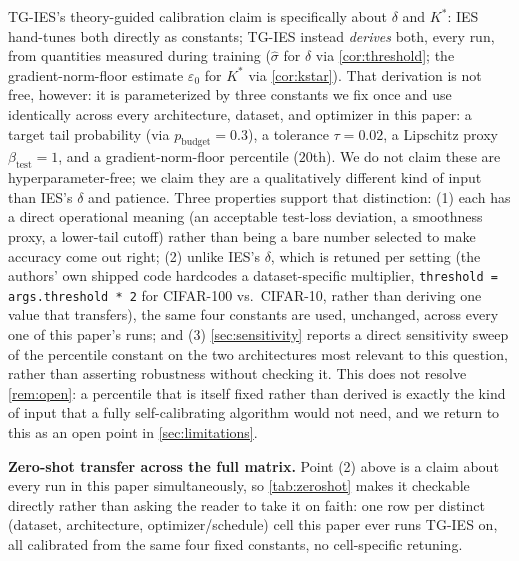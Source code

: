 \documentclass{article}
\theoremstyle{plain}
\theoremstyle{definition}
\theoremstyle{remark}
\begin{document}
TG-IES's theory-guided calibration claim is specifically about $\delta$ and $K^*$: IES hand-tunes both directly as constants; TG-IES instead \emph{derives} both, every run, from quantities measured during training ($\hat\sigma$ for $\delta$ via \cref{cor:threshold}; the gradient-norm-floor estimate $\varepsilon_0$ for $K^*$ via \cref{cor:kstar}). That derivation is not free, however: it is parameterized by three constants we fix once and use identically across every architecture, dataset, and optimizer in this paper: a target tail probability (via $p_{\mathrm{budget}}=0.3$), a tolerance $\tau=0.02$, a Lipschitz proxy $\beta_{\mathrm{test}}=1$, and a gradient-norm-floor percentile ($20$th). We do not claim these are hyperparameter-free; we claim they are a qualitatively different kind of input than IES's $\delta$ and patience. Three properties support that distinction: (1) each has a direct operational meaning (an acceptable test-loss deviation, a smoothness proxy, a lower-tail cutoff) rather than being a bare number selected to make accuracy come out right; (2) unlike IES's $\delta$, which is retuned per setting (the authors' own shipped code hardcodes a dataset-specific multiplier, \texttt{threshold = args.threshold * 2} for CIFAR-100 vs.\ CIFAR-10, rather than deriving one value that transfers), the same four constants are used, unchanged, across every one of this paper's runs; and (3) \cref{sec:sensitivity} reports a direct sensitivity sweep of the percentile constant on the two architectures most relevant to this question, rather than asserting robustness without checking it. This does not resolve \cref{rem:open}: a percentile that is itself fixed rather than derived is exactly the kind of input that a fully self-calibrating algorithm would not need, and we return to this as an open point in \cref{sec:limitations}.

\textbf{Zero-shot transfer across the full matrix.} Point (2) above is a claim about every run in this paper simultaneously, so \cref{tab:zeroshot} makes it checkable directly rather than asking the reader to take it on faith: one row per distinct (dataset, architecture, optimizer/schedule) cell this paper ever runs TG-IES on, all calibrated from the same four fixed constants, no cell-specific retuning.
\end{document}
